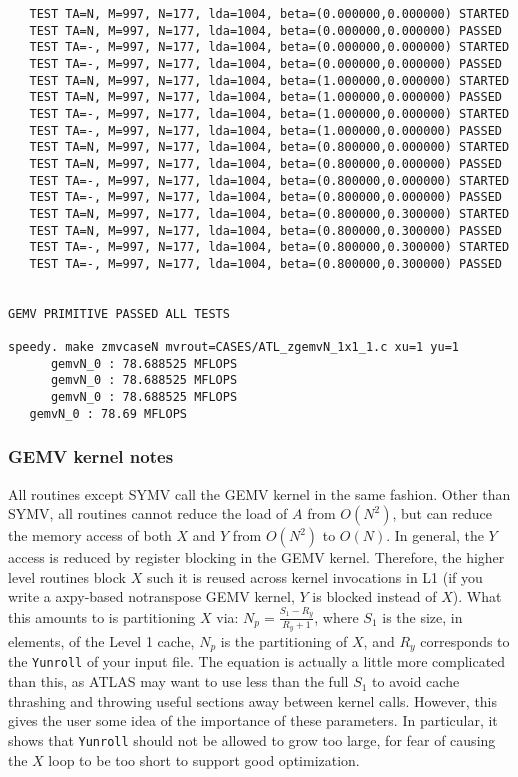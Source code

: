 \documentclass[11pt]{article}
\begin{document}
{\begin{verbatim}
   TEST TA=N, M=997, N=177, lda=1004, beta=(0.000000,0.000000) STARTED
   TEST TA=N, M=997, N=177, lda=1004, beta=(0.000000,0.000000) PASSED
   TEST TA=-, M=997, N=177, lda=1004, beta=(0.000000,0.000000) STARTED
   TEST TA=-, M=997, N=177, lda=1004, beta=(0.000000,0.000000) PASSED
   TEST TA=N, M=997, N=177, lda=1004, beta=(1.000000,0.000000) STARTED
   TEST TA=N, M=997, N=177, lda=1004, beta=(1.000000,0.000000) PASSED
   TEST TA=-, M=997, N=177, lda=1004, beta=(1.000000,0.000000) STARTED
   TEST TA=-, M=997, N=177, lda=1004, beta=(1.000000,0.000000) PASSED
   TEST TA=N, M=997, N=177, lda=1004, beta=(0.800000,0.000000) STARTED
   TEST TA=N, M=997, N=177, lda=1004, beta=(0.800000,0.000000) PASSED
   TEST TA=-, M=997, N=177, lda=1004, beta=(0.800000,0.000000) STARTED
   TEST TA=-, M=997, N=177, lda=1004, beta=(0.800000,0.000000) PASSED
   TEST TA=N, M=997, N=177, lda=1004, beta=(0.800000,0.300000) STARTED
   TEST TA=N, M=997, N=177, lda=1004, beta=(0.800000,0.300000) PASSED
   TEST TA=-, M=997, N=177, lda=1004, beta=(0.800000,0.300000) STARTED
   TEST TA=-, M=997, N=177, lda=1004, beta=(0.800000,0.300000) PASSED


GEMV PRIMITIVE PASSED ALL TESTS

speedy. make zmvcaseN mvrout=CASES/ATL_zgemvN_1x1_1.c xu=1 yu=1
      gemvN_0 : 78.688525 MFLOPS
      gemvN_0 : 78.688525 MFLOPS
      gemvN_0 : 78.688525 MFLOPS
   gemvN_0 : 78.69 MFLOPS

\end{verbatim}

\subsubsection{GEMV kernel notes}
All routines except SYMV call the GEMV kernel in the same fashion.
Other than SYMV, all routines cannot reduce the load of $A$ from $O(N^2)$,
but can reduce the memory access of both $X$ and $Y$ from $O(N^2)$ to
$O(N)$.  In general, the $Y$ access is reduced by register blocking in
the GEMV kernel.  Therefore, the higher level routines block $X$ such
it is reused across kernel invocations in L1 (if you write a axpy-based
notranspose GEMV kernel, $Y$ is blocked instead of $X$).  What this amounts
to is partitioning $X$ via:
$N_p = \frac{S_1 - R_y}{R_y+1}$, where $S_1$ is the size, in elements,
of the Level 1 cache, $N_p$ is the partitioning of $X$, and $R_y$ corresponds
to the {\tt Yunroll} of your input file.  The equation is actually a little
more complicated than this, as ATLAS may want to use less than the full 
$S_1$ to avoid cache thrashing and throwing useful sections away between
kernel calls.  However, this gives the user some idea of the importance of
these parameters.  In particular, it shows that {\tt Yunroll} should not
be allowed to grow too large, for fear of causing the $X$ loop to be
too short to support good optimization.

}
\end{document}
